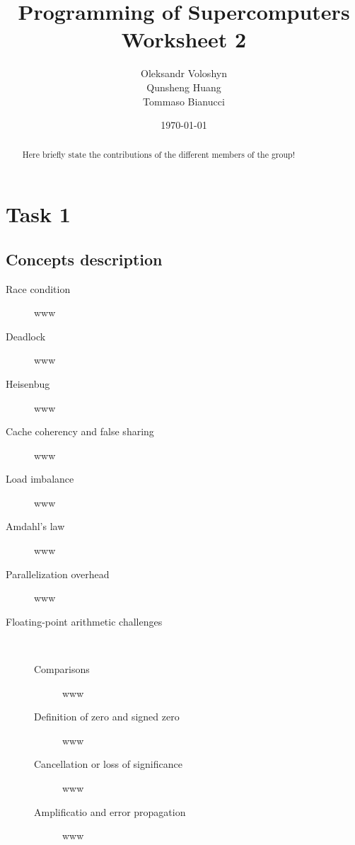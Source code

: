 \documentclass{article}
\title{Programming of Supercomputers\\Worksheet 2}
\author{Oleksandr Voloshyn\\ Qunsheng Huang\\ Tommaso Bianucci}
\date{\today}
\begin{document}
\maketitle
\renewcommand{\abstractname}{Group members's contributions}
\begin{abstract}
	Here briefly state the contributions of the different members of the group!
\end{abstract}

\section{Task 1}
\subsection{Concepts description}
\begin{description}
	\item[Race condition] www
	\item[Deadlock] www
	\item[Heisenbug] www
	\item[Cache coherency and false sharing] www
	\item[Load imbalance] www
	\item[Amdahl's law] www
	\item[Parallelization overhead] www
	\item[Floating-point arithmetic challenges] ~

		\begin{description}
			\item[Comparisons] www
			\item[Definition of zero and signed zero] www
			\item[Cancellation or loss of significance] www
			\item[Amplificatio and error propagation] www
		\end{description}
\end{description}
\end{document}
